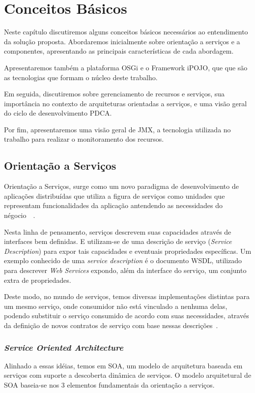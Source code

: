 \chapter{Conceitos Básicos}
\label{ch:2}
Neste capítulo discutiremos alguns conceitos básicos necessários ao entendimento da solução proposta. Abordaremos inicialmente sobre orientação a serviços e a componentes, apresentando as principais características de cada abordagem. 

Apresentaremos também a plataforma OSGi e o Framework iPOJO, que que são as tecnologias que formam o núcleo deste trabalho.

Em seguida, discutiremos sobre gerenciamento de recursos e serviços, sua importância no contexto de arquiteturas orientadas a serviços, e uma visão geral do ciclo de desenvolvimento PDCA. 

Por fim, apresentaremos uma visão geral de JMX, a tecnologia utilizada no trabalho para realizar o monitoramento dos recursos.

\section{Orientação a Serviços}
\label{sec:service}

Orientação a Serviços, surge como um novo paradigma de desenvolvimento de aplicações distribuídas que utiliza a figura de serviços como unidades que representam funcionalidades da aplicação antendendo as necessidades do négocio~\cite{erl2008soa}~\cite{cervantes2005technical}. 

Nesta linha de pensamento, serviços descrevem suas capacidades através de interfaces bem definidas. E utilizam-se de uma descrição de serviço (\textit{Service Description}) para expor tais capacidades e eventuais propriedades específicas. Um exemplo conhecido de uma \textit{service description} é o documento WSDL, utilizado para descrever \textit{Web Services} expondo, além da interface do serviço, um conjunto extra de propriedades.

Deste modo, no mundo de serviços, temos diversas implementações distintas para um mesmo serviço, onde consumidor não está vinculado a nenhuma delas, podendo substituir o serviço consumido de acordo com suas necessidades, através da definição de novos contratos de serviço com base nessas descrições~\cite{cervantes2005technical}.

\subsection{\textit{Service Oriented Architecture}}
Alinhado a essas idéias, temos em SOA, um modelo de arquitetura baseada em serviços com suporte a descoberta dinâmica de serviços. O modelo arquitetural de SOA baseia-se nos 3 elementos fundamentais da orientação a serviços.

